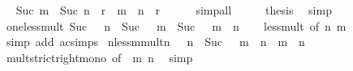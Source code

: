 \begin{isabellebody}
\ \isamarkupfalse%
\ {\isachardoublequoteopen}Suc\ {\isacharparenleft}{\kern0pt}m\ {\isacharminus}{\kern0pt}\ Suc\ n{\isacharparenright}{\kern0pt}\ {\isacharequal}{\kern0pt}\ r{\isachardoublequoteclose}\ \ {\isachardoublequoteopen}m\ {\isacharequal}{\kern0pt}\ n\ {\isacharplus}{\kern0pt}\ r{\isachardoublequoteclose}\isanewline
\ \ \ \ \isamarkupfalse%
\ simp{\isacharunderscore}{\kern0pt}all\isanewline
\ \ \isamarkupfalse%
\ \isamarkupfalse%
\ {\isacharquery}{\kern0pt}thesis\ \isamarkupfalse%
\ simp\isanewline
{}\isamarkupfalse%
%
\endisatagproof
{\isafoldproof}%
%
\isadelimproof
\isanewline
%
\endisadelimproof
\isanewline
{}\isamarkupfalse%
\ one{\isacharunderscore}{\kern0pt}less{\isacharunderscore}{\kern0pt}mult{\isacharcolon}{\kern0pt}\ {\isachardoublequoteopen}Suc\ {}\ {\isacharless}{\kern0pt}\ n\ {\isasymLongrightarrow}\ Suc\ {}\ {\isacharless}{\kern0pt}\ m\ {\isasymLongrightarrow}\ Suc\ {}\ {\isacharless}{\kern0pt}\ m\ {\isacharasterisk}{\kern0pt}\ n{\isachardoublequoteclose}\isanewline
%
\isadelimproof
\ \ %
\endisadelimproof
%
\isatagproof
{}\isamarkupfalse%
\ less{\isacharunderscore}{\kern0pt}{}{\isacharunderscore}{\kern0pt}mult\ {\isacharbrackleft}{\kern0pt}of\ n\ m{\isacharbrackright}{\kern0pt}\ \isamarkupfalse%
\ {\isacharparenleft}{\kern0pt}simp\ add{\isacharcolon}{\kern0pt}\ ac{\isacharunderscore}{\kern0pt}simps{\isacharparenright}{\kern0pt}%
\endisatagproof
{\isafoldproof}%
%
\isadelimproof
\isanewline
%
\endisadelimproof
\isanewline
{}\isamarkupfalse%
\ n{\isacharunderscore}{\kern0pt}less{\isacharunderscore}{\kern0pt}m{\isacharunderscore}{\kern0pt}mult{\isacharunderscore}{\kern0pt}n{\isacharcolon}{\kern0pt}\ {\isachardoublequoteopen}{}\ {\isacharless}{\kern0pt}\ n\ {\isasymLongrightarrow}\ Suc\ {}\ {\isacharless}{\kern0pt}\ m\ {\isasymLongrightarrow}\ n\ {\isacharless}{\kern0pt}\ m\ {\isacharasterisk}{\kern0pt}\ n{\isachardoublequoteclose}\isanewline
%
\isadelimproof
\ \ %
\endisadelimproof
%
\isatagproof
{}\isamarkupfalse%
\ mult{\isacharunderscore}{\kern0pt}strict{\isacharunderscore}{\kern0pt}right{\isacharunderscore}{\kern0pt}mono\ {\isacharbrackleft}{\kern0pt}of\ {}\ m\ n{\isacharbrackright}{\kern0pt}\ \isamarkupfalse%
\ simp%
\endisatagproof
{\isafoldproof}%
%
\isadelimproof
\isanewline
%
\endisadelimproof
\isanewline
{}\isamarkupfalse%

\end{isabellebody}
